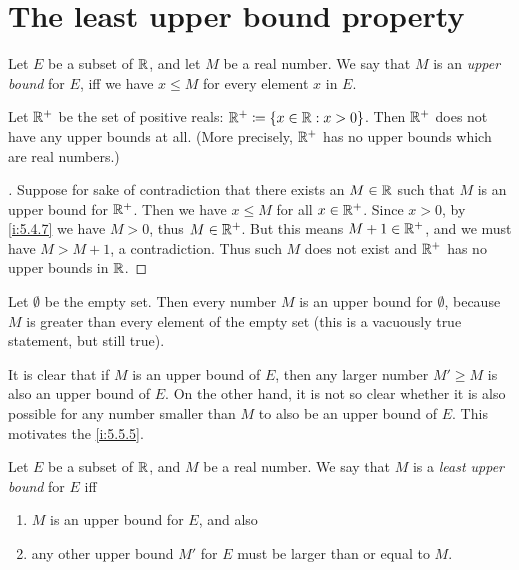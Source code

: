 \section{The least upper bound property}\label{i:sec:5.5}

\begin{defn}\label{i:5.5.1}
  Let \(E\) be a subset of \(\mathbb{R}\), and let \(M\) be a real number.
  We say that \(M\) is an \emph{upper bound} for \(E\), iff we have \(x \leq M\) for every element \(x\) in \(E\).
\end{defn}

\setcounter{thm}{2}
\begin{eg}\label{i:5.5.3}
  Let \(\mathbb{R}^+\) be the set of positive reals: \(\mathbb{R}^+ \coloneqq \left\lbrace x \in \mathbb{R} : x > 0\right\rbrace\).
  Then \(\mathbb{R}^+\) does not have any upper bounds at all.
  (More precisely, \(\mathbb{R}^+\) has no upper bounds which are real numbers.)
\end{eg}

\begin{proof}[]
  Suppose for sake of contradiction that there exists an \(M \in \mathbb{R}\) such that \(M\) is an upper bound for \(\mathbb{R}^+\).
  Then we have \(x \leq M\) for all \(x \in \mathbb{R}^+\).
  Since \(x > 0\), by \cref{i:5.4.7} we have \(M > 0\), thus \(M \in \mathbb{R}^+\).
  But this means \(M + 1 \in \mathbb{R}^+\), and we must have \(M > M + 1\), a contradiction.
  Thus such \(M\) does not exist and \(\mathbb{R}^+\) has no upper bounds in \(\mathbb{R}\).
\end{proof}

\begin{eg}\label{i:5.5.4}
  Let \(\emptyset\) be the empty set.
  Then every number \(M\) is an upper bound for \(\emptyset\), because \(M\) is greater than every element of the empty set
  (this is a vacuously true statement, but still true).
\end{eg}

\begin{note}
  It is clear that if \(M\) is an upper bound of \(E\), then any larger number \(M' \geq M\) is also an upper bound of \(E\).
  On the other hand, it is not so clear whether it is also possible for any number smaller than \(M\) to also be an upper bound of \(E\).
  This motivates the \cref{i:5.5.5}.
\end{note}

\begin{defn}\label{i:5.5.5}
  Let \(E\) be a subset of \(\mathbb{R}\), and \(M\) be a real number.
  We say that \(M\) is a \emph{least upper bound} for \(E\) iff
  \begin{enumerate}
    \item \(M\) is an upper bound for \(E\), and also
    \item any other upper bound \(M'\) for \(E\) must be larger than or equal to \(M\).
  \end{enumerate}
\end{defn}


